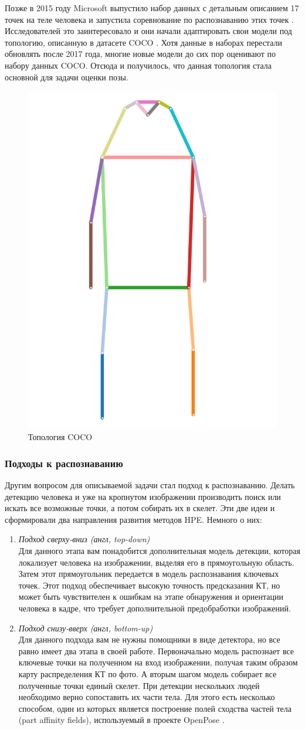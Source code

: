 Позже в 2015 году Microsoft выпустило набор данных с детальным описанием 17 точек на теле человека и запустила соревнование по распознаванию этих точек \cite{COCO_dataset, COCO_topology}. Исследователей это заинтересовало и они начали адаптировать свои модели под топологию, описанную в датасете COCO \cite{COCO_dataset}. Хотя данные в наборах перестали обновлять после 2017 года, многие новые модели до сих пор оценивают по набору данных COCO. Отсюда и получилось, что данная топология стала основной для задачи оценки позы.

\begin{figure}[h]
	\centering
	\includegraphics[width=.3\textwidth]{./images/tasks/coco_topology.png}
	\caption{Топология COCO}
	\label{fig:coco_topology}
\end{figure}

\subsubsection*{Подходы к распознаванию}

Другим вопросом для описываемой задачи стал подход к распознаванию. Делать детекцию человека и уже на кропнутом изображении производить поиск или искать все возможные точки, а потом собирать их в скелет. Эти две идеи и сформировали два направления развития методов HPE. Немного о них:
\begin{enumerate}
	\item \textit{Подход сверху-вниз (англ, top-down)}\\
	Для данного этапа вам понадобится дополнительная модель детекции, которая локализует человека на изображении, выделяя его в прямоугольную область. Затем этот прямоугольник передается в модель распознавания ключевых точек. Этот подход обеспечивает высокую точность предсказания КТ, но может быть чувствителен к ошибкам на этапе обнаружения и ориентации человека в кадре, что требует дополнительной предобработки изображений.
	\item \textit{Подход снизу-вверх (англ, bottom-up)}\\
	Для данного подхода вам не нужны помощники в виде детектора, но все равно имеет два этапа в своей работе. Первоначально модель распознает все ключевые точки на полученном на вход изображении, получая таким образом карту распределения КТ по фото. А вторым шагом модель собирает все полученные точки единый скелет. При детекции нескольких людей необходимо верно сопоставить их части тела. Для этого есть несколько способом, один из которых является построение полей сходства частей тела (part affinity fields), используемый в проекте OpenPose \cite{OpenPose}.
\end{enumerate}

